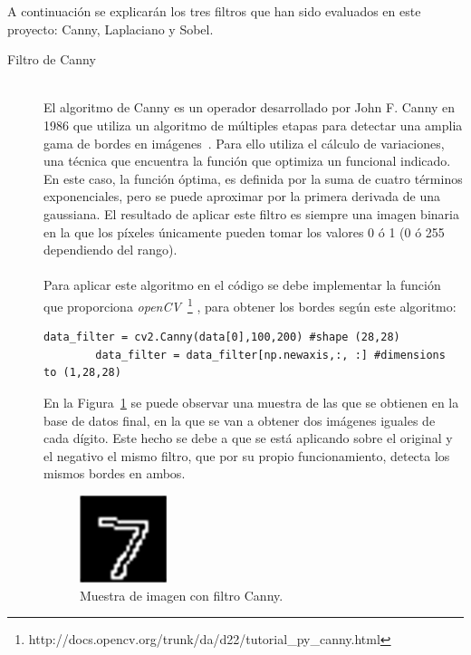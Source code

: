 A continuación se explicarán los tres filtros que han sido evaluados en este proyecto: Canny, Laplaciano y Sobel.\\

\begin{description}
	\item[Filtro de Canny] \hfill 
	\vspace{10pt}
	\\
	El algoritmo de Canny es un operador desarrollado por John F. Canny en 1986 que utiliza un algoritmo de múltiples etapas para detectar una amplia gama de bordes en imágenes~\cite{4767851}. Para ello utiliza el cálculo de variaciones, una técnica que encuentra la función que optimiza un funcional indicado. En este caso, la función óptima, es definida por la suma de cuatro términos exponenciales, pero se puede aproximar por la primera derivada de una gaussiana. El resultado de aplicar este filtro es siempre una imagen binaria en la que los píxeles únicamente pueden tomar los valores 0 ó 1 (0 ó 255 dependiendo del rango).\\
	\vspace{-10pt}
	\\
	Para aplicar este algoritmo en el código se debe implementar la función que proporciona \textit{openCV}~\footnote{http://docs.opencv.org/trunk/da/d22/tutorial\_py\_canny.html} , para obtener los bordes según este algoritmo:
	\vspace{10pt}
	\begin{lstlisting}[frame=single]
		data_filter = cv2.Canny(data[0],100,200) #shape (28,28)
		data_filter = data_filter[np.newaxis,:, :] #dimensions to (1,28,28)
	\end{lstlisting}
	En la Figura~\ref{fig.canny} se puede observar una muestra de las que se obtienen en la base de datos final, en la que se van a obtener dos imágenes iguales de cada dígito. Este hecho se debe a que se está aplicando sobre el original y el negativo el mismo filtro, que por su propio funcionamiento, detecta los mismos bordes en ambos.
	
	\begin{figure}[H]
		\begin{center}
			\includegraphics[width=0.25\textwidth]{figures/canny}
			\caption{Muestra de imagen con filtro Canny.}
			\label{fig.canny}
		\end{center}
	\end{figure}
	

\end{description}
